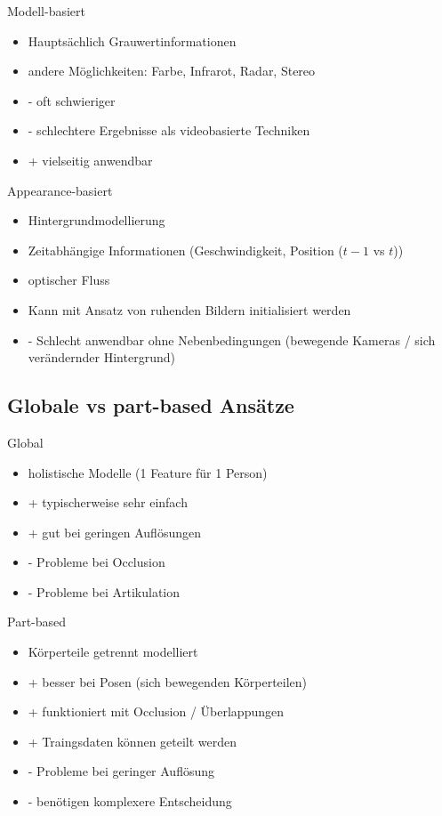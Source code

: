 \documentclass[paper=a4, fontsize=11pt]{scrartcl} %
\numberwithin{equation}{section} %
\numberwithin{figure}{section} %
\numberwithin{table}{section} %
\begin{document}
\begin{minipage}{0.45\textwidth}
Modell-basiert
\begin{itemize}
\item Hauptsächlich Grauwertinformationen
\item andere Möglichkeiten: Farbe, Infrarot, Radar, Stereo
\item - oft schwieriger
\item - schlechtere Ergebnisse als videobasierte Techniken
\item + vielseitig anwendbar
\end{itemize}
\end{minipage} \hfill
\begin{minipage}{0.45\textwidth}
Appearance-basiert
\begin{itemize}
\item Hintergrundmodellierung
\item Zeitabhängige Informationen (Geschwindigkeit, Position ($t-1$ vs $t$))
\item optischer Fluss
\item Kann mit Ansatz von ruhenden Bildern initialisiert werden
\item - Schlecht anwendbar ohne Nebenbedingungen (bewegende Kameras / sich verändernder Hintergrund)
\end{itemize}
\end{minipage}

\subsection{Globale vs part-based Ansätze}

\begin{minipage}{0.45\textwidth}
Global
\begin{itemize}
\item holistische Modelle (1 Feature für 1 Person)
\item + typischerweise sehr einfach
\item + gut bei geringen Auflösungen
\item - Probleme bei Occlusion
\item - Probleme bei Artikulation
\end{itemize}
\end{minipage} \hfill
\begin{minipage}{0.45\textwidth}
Part-based
\begin{itemize}
\item Körperteile getrennt modelliert
\item + besser bei Posen (sich bewegenden Körperteilen)
\item + funktioniert mit Occlusion / Überlappungen
\item + Traingsdaten können geteilt werden
\item - Probleme bei geringer Auflösung
\item - benötigen komplexere Entscheidung
\end{itemize}
\end{minipage}
\end{document}
